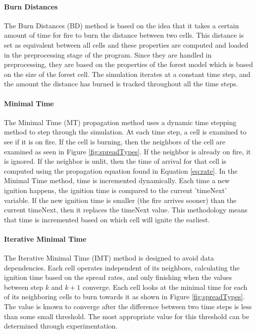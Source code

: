 \paragraph{Burn Distances}
The Burn Distances (BD) method is based on the idea that it takes a certain amount of time for fire to burn the distance between two cells. This distance is set as equivalent between all cells and these properties are computed and loaded in the preprocessing stage of the program. Since they are handled in preprocessing, they are based on the properties of the forest model which is based on the size of the forest cell. The simulation iterates at a constant time step, and the amount the distance has burned is tracked throughout all the time steps. 

\paragraph{Minimal Time}
The Minimal Time (MT) propagation method uses a dynamic time stepping method to step through the simulation. At each time step, a cell is examined to see if it is on fire. If the cell is burning, then the neighbors of the cell are examined as seen in Figure \ref{fig:spreadTypes}. If the neighbor is already on fire, it is ignored. If the neighbor is unlit, then the time of arrival for that cell is computed using the propagation equation found in Equation \ref{eq:rate}. In the Minimal Time method, time is incremented dynamically. Each time a new ignition happens, the ignition time is compared to the current 'timeNext' variable. If the new ignition time is smaller (the fire arrives sooner) than the current timeNext, then it replaces the timeNext value. This methodology means that time is incremented based on which cell will ignite the earliest.

\paragraph{Iterative Minimal Time}
The Iterative Minimal Time (IMT) method is designed to avoid data dependencies. Each cell operates independent of its neighbors, calculating the ignition time based on the spread rates, and only finishing when the values between step $k$ and $k + 1$ converge. Each cell looks at the minimal time for each of its neighboring cells to burn towards it as shown in Figure \ref{fig:spreadTypes}. The value is known to converge after the difference between two time steps is less than some small threshold. The most appropriate value for this threshold can be determined through experimentation.

